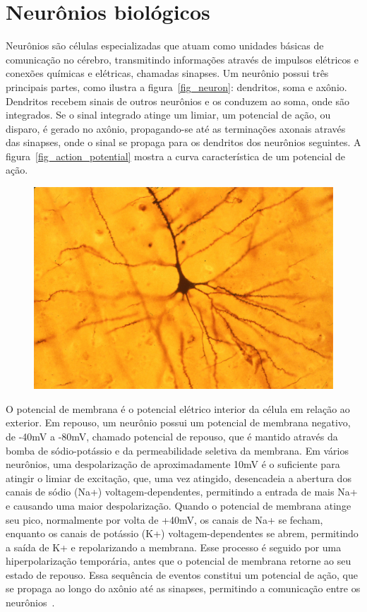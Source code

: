\section{Neurônios biológicos}\label{sec_neurônios}

Neurônios são células especializadas que atuam como unidades básicas de comunicação no cérebro, transmitindo informações através
de impulsos elétricos e conexões químicas e elétricas, chamadas sinapses. Um neurônio possui três principais partes, como ilustra
a figura~\ref{fig_neuron}: dendritos, soma e axônio. Dendritos recebem sinais de outros neurônios e os conduzem ao soma,
onde são integrados. Se o sinal integrado atinge um limiar, um potencial de ação, ou disparo, é gerado no axônio, propagando-se
até as terminações axonais através das sinapses, onde o sinal se propaga para os dendritos dos neurônios seguintes. A
figura~\ref{fig_action_potential} mostra a curva característica de um potencial de ação.

\begin{figure}[!ht]
\centering
\includegraphics[width=12cm]{figuras/neuron.png}
\end{figure}

O potencial de membrana é o potencial elétrico interior da célula em relação ao exterior. Em repouso, um neurônio possui um
potencial de membrana negativo, de -40mV a -80mV, chamado potencial de repouso, que é mantido através da bomba de sódio-potássio e
da permeabilidade seletiva da membrana. Em vários neurônios, uma despolarização de aproximadamente 10mV é o suficiente para
atingir o limiar de excitação, que, uma vez atingido, desencadeia a abertura dos canais de sódio (Na+) voltagem-dependentes,
permitindo a entrada de mais Na+ e causando uma maior despolarização. Quando o potencial de membrana atinge seu pico, normalmente
por volta de +40mV, os canais de Na+ se fecham, enquanto os canais de potássio (K+) voltagem-dependentes se abrem, permitindo a
saída de K+ e repolarizando a membrana. Esse processo é seguido por uma hiperpolarização temporária, antes que o potencial de
membrana retorne ao seu estado de repouso. Essa sequência de eventos constitui um potencial de ação, que se propaga ao longo do
axônio até as sinapses, permitindo a comunicação entre os neurônios~\cite{kandelPrinciples2021}.

